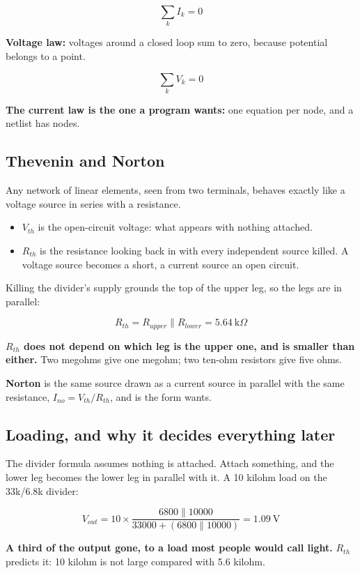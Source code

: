 \[
  \sum_k I_k = 0
\]

\textbf{Voltage law:} voltages around a closed loop sum to zero, because potential belongs to a point.

\[
  \sum_k V_k = 0
\]

\textbf{The current law is the one a program wants:} one equation per node, and a netlist has nodes.

\subsection{Thevenin and Norton}
\label{c1:sec:a5}
Any network of linear elements, seen from two terminals, behaves exactly like a voltage source in series with a resistance.

\begin{itemize}
  \item $V_{th}$ is the open-circuit voltage: what appears with nothing attached.
  \item $R_{th}$ is the resistance looking back in with every independent source killed. A voltage source becomes a short, a current source an open circuit.
\end{itemize}
Killing the divider's supply grounds the top of the upper leg, so the legs are in parallel:

\[
  R_{th} = R_{upper} \parallel R_{lower} = 5.64\ \text{k}\Omega
\]

\textbf{$R_{th}$ does not depend on which leg is the upper one, and is smaller than either.} Two megohms give one megohm; two ten-ohm resistors give five ohms.

\textbf{Norton} is the same source drawn as a current source in parallel with the same resistance, $I_{no} = V_{th}/R_{th}$, and is the form  wants.

\subsection{Loading, and why it decides everything later}
\label{c1:sec:a6}
The divider formula assumes nothing is attached. Attach something, and the lower leg becomes the lower leg in parallel with it. A 10 kilohm load on the 33k/6.8k divider:

\[
  V_{out} = 10 \times \frac{6800 \parallel 10000}{33000 + (6800 \parallel 10000)} = 1.09\ \text{V}
\]

\textbf{A third of the output gone, to a load most people would call light.} $R_{th}$ predicts it: 10 kilohm is not large compared with 5.6 kilohm.

